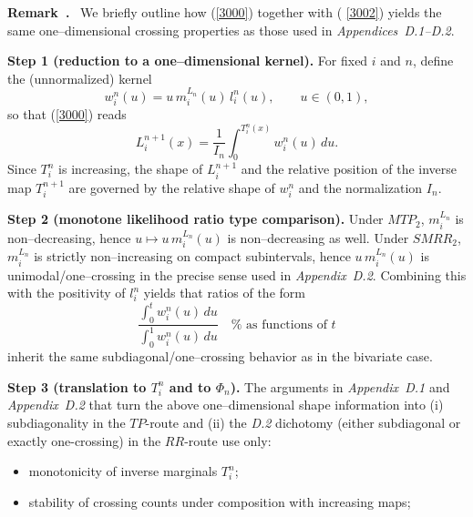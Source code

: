 \documentclass[onecolumn]{article}
\newenvironment{remark}{  \refstepcounter{theorem}  \par\medskip\noindent\textbf{Remark~\thetheorem.}\rmfamily\ }{\par\medskip}
\begin{document}
\begin{remark}
\label{alt-proof-outline} We briefly outline how (\ref{3000}) together with (%
\ref{3002}) yields the same one--dimensional crossing properties as those
used in \textit{Appendices~D.1--D.2}.

\smallskip \noindent \textbf{Step 1 (reduction to a one--dimensional kernel).%
} For fixed $i$ and $n$, define the (unnormalized) kernel 
\begin{equation}
w_{i}^{n}(u)=u\,m_{i}^{L_{n}}(u)\,l_{i}^{n}(u),\qquad u\in (0,1),
\label{3003}
\end{equation}%
so that (\ref{3000}) reads 
\begin{equation}
L_{i}^{n+1}(x)=\frac{1}{I_{n}}\int_{0}^{T_{i}^{n}(x)}w_{i}^{n}(u)\,du.
\label{3004}
\end{equation}%
Since $T_{i}^{n}$ is increasing, the shape of $L_{i}^{n+1}$ and the relative
position of the inverse map $T_{i}^{n+1}$ are governed by the relative shape
of $w_{i}^{n}$ and the normalization $I_{n}$.

\smallskip \noindent \textbf{Step 2 (monotone likelihood ratio type
comparison).} Under $MTP_{2}$, $m_{i}^{L_{n}}$ is non--decreasing, hence $%
u\mapsto u\,m_{i}^{L_{n}}(u)$ is non--decreasing as well. Under $SMRR_{2}$, $%
m_{i}^{L_{n}}$ is strictly non--increasing on compact subintervals, hence $%
u\,m_{i}^{L_{n}}(u)$ is unimodal/one--crossing in the precise sense used in 
\textit{Appendix~D.2}. Combining this with the positivity of $l_{i}^{n}$
yields that ratios of the form 
\begin{equation}
\frac{\int_{0}^{t}w_{i}^{n}(u)\,du}{\int_{0}^{1}w_{i}^{n}(u)\,du}\quad \text{%
as functions of $t$}  \label{3005}
\end{equation}%
inherit the same subdiagonal/one--crossing behavior as in the bivariate case.

\smallskip \noindent \textbf{Step 3 (translation to $T_{i}^{n}$ and to $\Phi
_{n}$).} The arguments in \textit{Appendix~D.1} and \textit{Appendix~D.2}
that turn the above one--dimensional shape information into (i)
subdiagonality in the $TP$-route and (ii) the \textit{D.2} dichotomy (either
subdiagonal or exactly one-crossing) in the $RR$-route use only:

\begin{itemize}
\item monotonicity of inverse marginals $T_{i}^{n}$;

\item stability of crossing counts under composition with increasing maps;


\end{itemize}
\end{remark}
\end{document}
